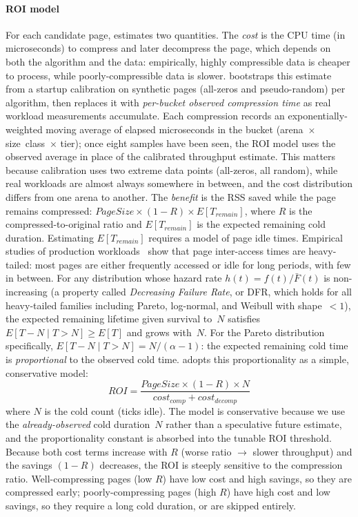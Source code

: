 \paragraph{ROI model}
For each candidate page, \sys estimates two quantities.  The
\emph{cost} is the CPU time (in microseconds) to compress and later
decompress the page, which depends on both the algorithm and the
data: empirically, highly compressible data is cheaper to process,
while poorly-compressible data is slower.  \sys bootstraps this
estimate from a startup calibration on synthetic pages (all-zeros
and pseudo-random) per algorithm, then replaces it with
\emph{per-bucket observed compression time} as real workload
measurements accumulate.  Each compression records an
exponentially-weighted moving average of elapsed microseconds in
the bucket (arena~$\times$ size~class~$\times$ tier); once eight
samples have been seen, the ROI model uses the observed average
in place of the calibrated throughput estimate.  This matters
because calibration uses two extreme data points (all-zeros, all
random), while real workloads are almost always somewhere in
between, and the cost distribution differs from one arena to
another.
The \emph{benefit} is the RSS saved while the page remains
compressed: $\mathit{PageSize} \times (1 - R) \times E[T_{\mathit{remain}}]$,
where $R$ is the compressed-to-original ratio and
$E[T_{\mathit{remain}}]$ is the expected remaining cold duration.
Estimating $E[T_{\mathit{remain}}]$ requires a model of page idle
times.  Empirical studies of production
workloads~\cite{maas2020adaptive,amaro2023memory} show that page
inter-access times are heavy-tailed: most pages are either
frequently accessed or idle for long periods, with few in between.
For any distribution whose hazard rate $h(t) = f(t)/\bar{F}(t)$ is
non-increasing (a property called \emph{Decreasing Failure Rate},
or DFR, which holds for all heavy-tailed families including
Pareto, log-normal, and Weibull with shape~$< 1$), the expected
remaining lifetime given survival to~$N$ satisfies
$E[T - N \mid T > N] \geq E[T]$ and grows with~$N$.  For the
Pareto distribution specifically,
$E[T - N \mid T > N] = N/(\alpha - 1)$: the expected remaining
cold time is \emph{proportional} to the observed cold time.
\sys adopts this proportionality as a simple, conservative
model:
\[
\mathit{ROI} = \frac{\mathit{PageSize} \times (1 - R) \times N}
                     {\mathit{cost}_{\mathit{comp}} + \mathit{cost}_{\mathit{decomp}}}
\]
where $N$ is the cold count (ticks idle).  The model is
conservative because we use the \emph{already-observed} cold
duration~$N$ rather than a speculative future estimate, and
the proportionality constant is absorbed into the tunable ROI
threshold.  Because both cost terms increase with $R$ (worse
ratio $\to$ slower throughput) and the savings $(1 - R)$
decreases, the ROI is steeply sensitive to the compression
ratio.  Well-compressing pages (low $R$) have low cost and high
savings, so they are compressed early; poorly-compressing pages
(high $R$) have high cost and low savings, so they require a long
cold duration, or are skipped entirely.

